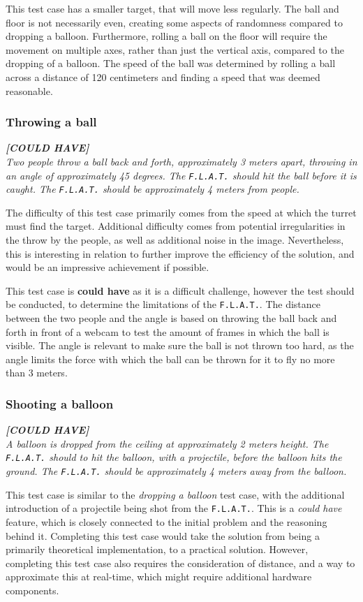This test case has a smaller target, that will move less regularly.
The ball and floor is not necessarily even, creating some aspects of randomness compared to dropping a balloon.
Furthermore, rolling a ball on the floor will require the movement on multiple axes, rather than just the vertical axis, compared to the dropping of a balloon.
The speed of the ball was determined by rolling a ball across a distance of 120 centimeters and finding a speed that was deemed reasonable.

\subsubsection{Throwing a ball}
\textit{\textbf{[COULD HAVE]}}\\
\textit{Two people throw a ball back and forth, approximately 3 meters apart, throwing in an angle of approximately 45 degrees.
The \texttt{F.L.A.T.} should hit the ball before it is caught.
The \texttt{F.L.A.T.} should be approximately 4 meters from people.}

The difficulty of this test case primarily comes from the speed at which the turret must find the target.
Additional difficulty comes from potential irregularities in the throw by the people, as well as additional noise in the image.
Nevertheless, this is interesting in relation to further improve the efficiency of the solution, and would be an impressive achievement if possible.

This test case is \textbf{could have} as it is a difficult challenge, however the test should be conducted, to determine the limitations of the \texttt{F.L.A.T.}.
The distance between the two people and the angle is based on throwing the ball back and forth in front of a webcam to test the amount of frames in which the ball is visible.
The angle is relevant to make sure the ball is not thrown too hard, as the angle limits the force with which the ball can be thrown for it to fly no more than 3 meters.

\subsubsection{Shooting a balloon}
\textit{\textbf{[COULD HAVE]}}\\
\textit{A balloon is dropped from the ceiling at approximately 2 meters height.
The \texttt{F.L.A.T.} should to hit the balloon, with a projectile, before the balloon hits the ground.
The \texttt{F.L.A.T.} should be approximately 4 meters away from the balloon.}

This test case is similar to the \textit{dropping a balloon} test case, with the additional introduction of a projectile being shot from the \texttt{F.L.A.T.}.
This is a \textit{could have} feature, which is closely connected to the initial problem and the reasoning behind it.
Completing this test case would take the solution from being a primarily theoretical implementation, to a practical solution.
However, completing this test case also requires the consideration of distance, and a way to approximate this at real-time, which might require additional hardware components.
